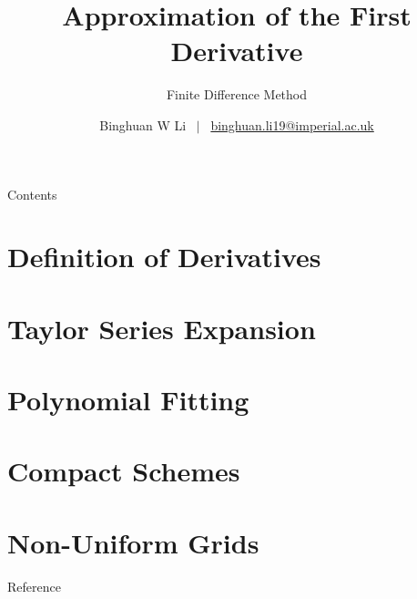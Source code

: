 \documentclass[10pt, aspectratio=169]{beamer}
\title{Approximation of the First Derivative}
\subtitle{Finite Difference Method\cite{Ferziger2002}}
\author{Binghuan W Li \ $\lvert$ \   \href{mailto:binghuan.li19@imperial.ac.uk}{binghuan.li19@imperial.ac.uk}}
\institute{Department of Bioengineering, Imperial College London}
\begin{document}
\maketitle

\begin{frame}{Contents}
\tableofcontents
\end{frame}

\section{Definition of Derivatives}


\section{Taylor Series Expansion}


\section{Polynomial Fitting}


\section{Compact Schemes}


\section{Non-Uniform Grids}





\appendix

\begin{frame}{Reference}
 
 
\end{frame}
\end{document}
